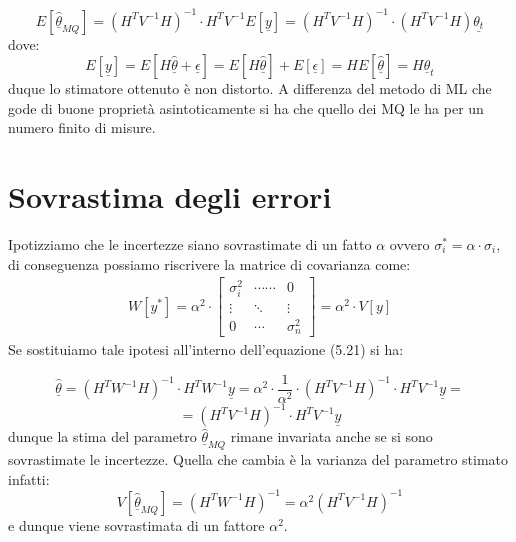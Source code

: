 \begin{equation*}
	E[\hat{\underline{\theta}}_{MQ}] = (H^TV^{-1}H)^{-1}\cdot H^TV^{-1}E[\underline{y}] = (H^TV^{-1}H)^{-1}\cdot (H^TV^{-1}H) \underline{\theta_t}
\end{equation*}
dove:
\begin{equation*}
	E[\underline{y}] = E[H \hat{\underline{\theta}} + \underline{\epsilon}] = E[H \hat{\underline{\theta}}] + E[\underline{\epsilon}] = H E[\hat{\underline{\theta}}] = H\underline{\theta}_t
\end{equation*}
duque lo stimatore ottenuto \`{e} non distorto.
\newline
A differenza del metodo di ML che gode di buone propriet\`{a} asintoticamente si ha che quello dei MQ le ha per un numero finito di misure.

\section{Sovrastima degli errori}

Ipotizziamo che le incertezze siano sovrastimate di un fatto $\alpha$ ovvero $\sigma_i^* = \alpha \cdot \sigma_i$, di conseguenza possiamo riscrivere la matrice di covarianza come:
\begin{align*}
W[y^*] = \alpha^2 \cdot  
\begin{bmatrix}
	\sigma_i^2 & \cdots\cdots & 0 \\
	\vdots & \ddots & \vdots \\
	0 & \cdots & \sigma_n^2
	\end{bmatrix}
	=\alpha^2 \cdot V[y]
\end{align*}
Se sostituiamo tale ipotesi all'interno dell'equazione (5.21) si ha:

\begin{equation}
	\underline{\hat{\theta }} = (H^TW^{-1}H)^{-1}\cdot H^TW^{-1}\underline{y} = \alpha^2 \cdot \dfrac{1}{\alpha^2} \cdot (H^TV^{-1}H)^{-1}\cdot H^TV^{-1}\underline{y} =  
\end{equation}
\begin{equation*}
	=(H^TV^{-1}H)^{-1}\cdot H^TV^{-1}\underline{y}
\end{equation*}
dunque la stima del parametro $\hat{\underline{\theta}}_{MQ}$ rimane invariata anche se si sono sovrastimate le incertezze. Quella che cambia \`{e} la varianza del parametro stimato infatti:
\begin{equation}
	V[\hat{\underline{\theta}}_{MQ}] = (H^{T}W^{-1}H)^{-1} = \alpha^2(H^{T}V^{-1}H)^{-1}
\end{equation}
e dunque viene sovrastimata di un fattore $\alpha^2$.

